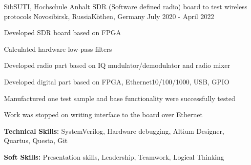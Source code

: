 \begin{cventries}
  \cventry
    {SibSUTI, Hochschule Anhalt} %
    {SDR (Software defined radio) board to test wireless protocols} %
    {Novosibirsk, Russia\newline Köthen, Germany} %
    {July 2020 - April 2022} %
    {
      \begin{cvitems} %
        \item {Developed SDR board based on FPGA}
        \item {Calculated hardware low-pass filters}
        \item {Developed radio part based on IQ mudulator/demodulator and radio mixer}
        \item {Developed digital part based on FPGA, Ethernet10/100/1000, USB, GPIO}
        \item {Manufactured one test sample and base functionality were successfully tested}
        \item {Work was stopped on writing interface to the board over Ethernet}
        \item {\textbf{Technical Skills:} SystemVerilog, Hardware debugging, Altium Designer, Quartus, Questa, Git}
        \item {\textbf{Soft Skills:} Presentation skills, Leadership, Teamwork, Logical Thinking}
      \end{cvitems}
    }

\end{cventries}
